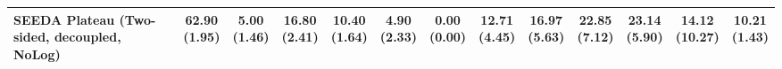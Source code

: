 \begin{table}[H]
{\begin{tabular}{l|cccccc|cccccc}
SEEDA Plateau (Two-sided, decoupled, NoLog) & \bfseries \makecell{62.90 \\ (1.95)} & \makecell{5.00 \\ (1.46)} & {\cellcolor[HTML]{C8E6C9}} \makecell{16.80 \\ (2.41)} & \makecell{10.40 \\ (1.64)} & \makecell{4.90 \\ (2.33)} & \makecell{0.00 \\ (0.00)} & \makecell{12.71 \\ (4.45)} & \makecell{16.97 \\ (5.63)} & {\cellcolor[HTML]{C8E6C9}} \makecell{22.85 \\ (7.12)} & \bfseries \makecell{23.14 \\ (5.90)} & \makecell{14.12 \\ (10.27)} & \makecell{10.21 \\ (1.43)} \\
\bottomrule
\end{tabular}
}%
\end{table}
